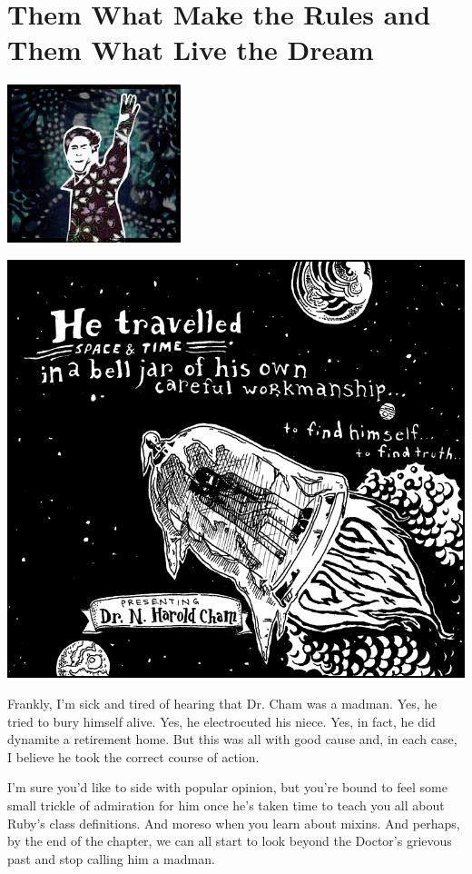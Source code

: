 \documentclass[10pt,twoside]{report}
\begin{document}
\chapter{Them What Make the Rules and Them What Live the Dream}
\vfill
\begin{center}
  \includegraphics{cache/chapterpoignantguide5.png}
\end{center}
\vspace{2cm}
\newpage
\thispagestyle{empty}
\mbox{}
\clearpage
	\includegraphics[width=1.0\textwidth]{cache/32.png}

Frankly, I'm sick and tired of hearing that Dr. Cham was a madman.
Yes, he tried to bury himself alive.  Yes, he electrocuted his niece.
Yes, in fact, he did dynamite a retirement home.  But this was all
with good cause and, in each case, I believe he took the correct
course of action.

I'm sure you'd like to side with popular opinion, but you're bound to
feel some small trickle of admiration for him once he's taken time to
teach you all about Ruby's class definitions. And moreso when you
learn about mixins.  And perhaps, by the end of the chapter, we can
all start to look beyond the Doctor's grievous past and stop calling
him a madman.
\end{document}

